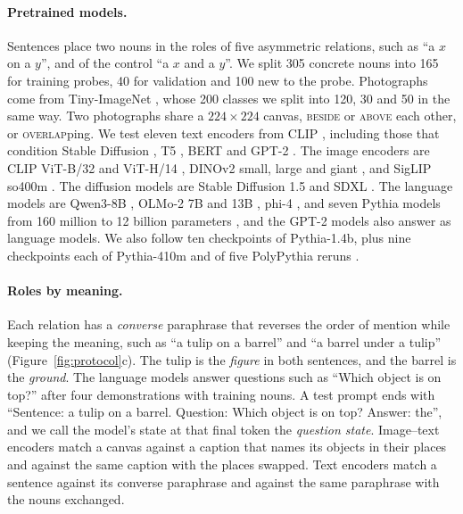 \documentclass[10pt]{article}
\theoremstyle{plain}
\theoremstyle{remark}
\begin{document}
\paragraph{Pretrained models.} Sentences place two nouns in the roles of five asymmetric relations, such as ``a $x$ on a $y$'', and of the control ``a $x$ and a $y$''. We split 305 concrete nouns into 165 for training probes, 40 for validation and 100 new to the probe. Photographs come from Tiny-ImageNet \citep{le2015tiny}, whose 200 classes we split into 120, 30 and 50 in the same way. Two photographs share a $224 \times 224$ canvas, \textsc{beside} or \textsc{above} each other, or \textsc{overlap}ping. We test eleven text encoders from CLIP \citep{radford2021clip}, including those that condition Stable Diffusion \citep{rombach2022}, T5 \citep{raffel2020t5}, BERT \citep{devlin2019bert} and GPT-2 \citep{radford2019gpt2}. The image encoders are CLIP ViT-B/32 and ViT-H/14 \citep{radford2021clip,cherti2023}, DINOv2 small, large and giant \citep{oquab2024dinov2}, and SigLIP so400m \citep{zhai2023siglip}. The diffusion models are Stable Diffusion 1.5 and SDXL \citep{rombach2022}. The language models are Qwen3-8B \citep{yang2025qwen3}, OLMo-2 7B and 13B \citep{olmo2024olmo2}, phi-4 \citep{abdin2024phi4}, and seven Pythia models from 160 million to 12 billion parameters \citep{biderman2023pythia}, and the GPT-2 models also answer as language models. We also follow ten checkpoints of Pythia-1.4b, plus nine checkpoints each of Pythia-410m and of five PolyPythia reruns \citep{vanderwal2025polypythias}.

\paragraph{Roles by meaning.} Each relation has a \emph{converse} paraphrase that reverses the order of mention while keeping the meaning, such as ``a tulip on a barrel'' and ``a barrel under a tulip'' (Figure~\ref{fig:protocol}c). The tulip is the \emph{figure} in both sentences, and the barrel is the \emph{ground}. The language models answer questions such as ``Which object is on top?'' after four demonstrations with training nouns. A test prompt ends with ``Sentence: a tulip on a barrel. Question: Which object is on top? Answer: the'', and we call the model's state at that final token the \emph{question state}. Image--text encoders match a canvas against a caption that names its objects in their places and against the same caption with the places swapped. Text encoders match a sentence against its converse paraphrase and against the same paraphrase with the nouns exchanged.
\end{document}
